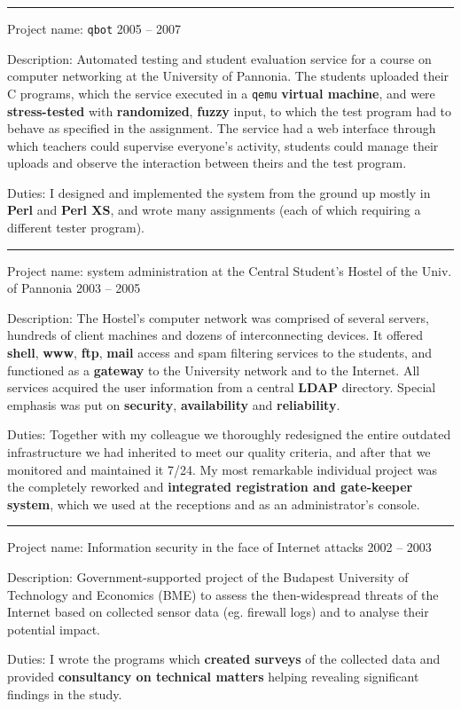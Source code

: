 \documentclass[a4paper,12pt]{article}
\newcommand\Yell{\textbf}
\newcommand\Label{\textsf}
\newcommand{\midline}{\rule[0.5ex]{\linewidth-\parindent}{.5pt}}
\begin{document}
\midline\par
\Label{Project name}: \texttt{qbot}\hfill
\Label{2005 -- 2007}\par
\Label{Description}: Automated testing and student evaluation service for a
course on computer networking at the University of Pannonia.  The students
uploaded their C programs, which the service executed in a \texttt{qemu}
\Yell{virtual machine}, and were \Yell{stress-tested} with \Yell{randomized},
\Yell{fuzzy} input, to which the test program had to behave as specified in
the assignment.  The service had a web interface through which teachers could
supervise everyone's activity, students could manage their uploads and observe
the interaction between theirs and the test program.\par
\Label{Duties}: I designed and implemented the system from the ground up mostly
in \Yell{Perl} and \Yell{Perl XS}, and wrote many assignments (each of which
requiring a different tester program).

\midline\par
\Label{Project name}: system administration at the Central Student's Hostel
of the Univ. of Pannonia\hfill
\Label{2003 -- 2005}\par
\Label{Description}: The Hostel's computer network was comprised of several
servers, hundreds of client machines and dozens of interconnecting devices.
It offered \Yell{shell}, \Yell{www}, \Yell{ftp}, \Yell{mail} access and spam
filtering services to the students, and functioned as a \Yell{gateway} to
the University network and to the Internet.  All services acquired the user
information from a central \Yell{LDAP} directory.  Special emphasis was put on
\Yell{security}, \Yell{availability} and \Yell{reliability}.\par
\Label{Duties}: Together with my colleague we thoroughly redesigned the entire
outdated infrastructure we had inherited to meet our quality criteria, and
after that we monitored and maintained it 7/24.  My most remarkable individual
project was the completely reworked and \Yell{integrated registration and
gate-keeper system}, which we used at the receptions and as an administrator's
console.

\midline\par
\Label{Project name}: Information security in the face of Internet attacks\hfill
\Label{2002 -- 2003}\par
\Label{Description}: Government-supported project of the Budapest University
of Technology and Economics (BME) to assess the then-widespread threats of
the Internet based on collected sensor data (eg. firewall logs) and
to analyse their potential impact.\par
\Label{Duties}: I wrote the programs which \Yell{created surveys} of
the collected data and provided \Yell{consultancy on technical matters}
helping revealing significant findings in the study.
\end{document}
